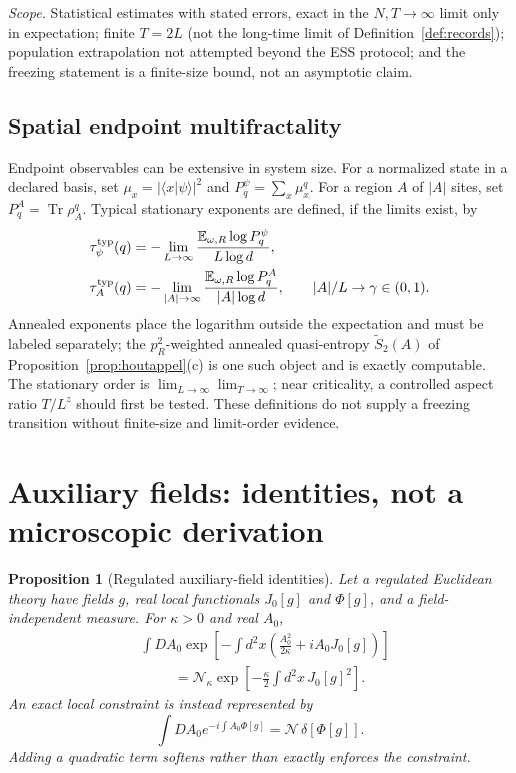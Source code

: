 \documentclass[aps,prx,reprint,superscriptaddress,nobibnotes,longbibliography]{revtex4-2}
\newtheorem{proposition}{Proposition}
\theoremstyle{remark}
\newcommand{\Tr}{\operatorname{Tr}}
\newcommand{\E}{\mathbb E}
\begin{document}
\emph{Scope.}  Statistical estimates with stated errors, exact in the $N,T\to\infty$ limit only in expectation; finite $T=2L$ (not the long-time limit of Definition~\ref{def:records}); population extrapolation not attempted beyond the ESS protocol; and the freezing statement is a finite-size bound, not an asymptotic claim.

\subsection{Spatial endpoint multifractality}

Endpoint observables can be extensive in system size.  For a normalized state in a declared basis, set $\mu_x=|\langle x|\psi\rangle|^2$ and $P_q^\psi=\sum_x\mu_x^q$.  For a region $A$ of $|A|$ sites, set $P_q^A=\Tr\rho_A^q$.  Typical stationary exponents are defined, if the limits exist, by
\begin{align}
 \tau_\psi^{\rm typ}(q)&=-\lim_{L\to\infty}\frac{\E_{\omega,R}\log P_q^\psi}{L\log d},\\
 \tau_A^{\rm typ}(q)&=-\lim_{|A|\to\infty}\frac{\E_{\omega,R}\log P_q^A}{|A|\log d},\qquad |A|/L\to\gamma\in(0,1).
\end{align}
Annealed exponents place the logarithm outside the expectation and must be labeled separately; the $p_R^2$-weighted annealed quasi-entropy $\tilde S_2(A)$ of Proposition~\ref{prop:houtappel}(c) is one such object and is exactly computable.  The stationary order is $\lim_{L\to\infty}\lim_{T\to\infty}$; near criticality, a controlled aspect ratio $T/L^z$ should first be tested.  These definitions do not supply a freezing transition without finite-size and limit-order evidence.

\section{Auxiliary fields: identities, not a microscopic derivation}
\label{sec:aux}

\begin{proposition}[Regulated auxiliary-field identities]
\label{thm:aux}
Let a regulated Euclidean theory have fields $g$, real local functionals $J_0[g]$ and $\Phi[g]$, and a field-independent measure.  For $\kappa>0$ and real $A_0$,
\begin{align}
 &\int DA_0\exp\left[-\int d^2x\left(\frac{A_0^2}{2\kappa}+iA_0J_0[g]\right)\right]\nonumber\\
 &\hspace{1cm}=\mathcal N_\kappa\exp\left[-\frac\kappa2\int d^2x\,J_0[g]^2\right].
 \label{eq:HS}
\end{align}
An exact local constraint is instead represented by
\begin{equation}
 \int DA_0e^{-i\int A_0\Phi[g]}=\mathcal N\,\delta[\Phi[g]].
 \label{eq:constraint}
\end{equation}
Adding a quadratic term softens rather than exactly enforces the constraint.
\end{proposition}
\end{document}
